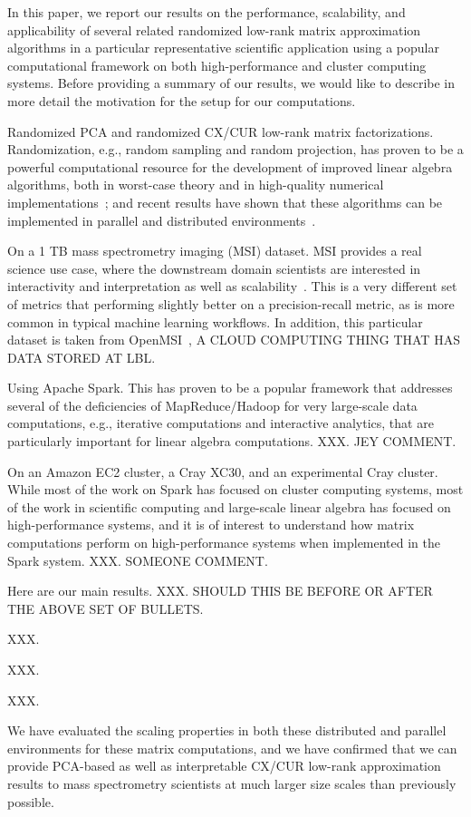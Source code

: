 In this paper, we report our results on the performance, scalability, and applicability of several related randomized low-rank matrix approximation algorithms in a particular representative scientific application using a popular computational framework on both high-performance and cluster computing systems.
Before providing a summary of our results, we would like to describe in more detail the motivation for the setup for our computations.
\begin{compactitem}
\item
Randomized PCA and randomized CX/CUR low-rank matrix factorizations. 
Randomization, e.g., random sampling and random projection, has proven to be a powerful computational resource for the development of improved linear algebra algorithms, both in worst-case theory and in high-quality numerical implementations~\cite{Mah-mat-rev_BOOK}; and recent results have shown that these algorithms can be implemented in parallel and distributed environments~\cite{YMM15_TR}.
\item
On a 1 TB mass spectrometry imaging (MSI) dataset.
MSI provides a real science use case, where the downstream domain scientists are interested in interactivity and interpretation as well as scalability~\cite{YRPMB15}.
This is a very different set of metrics that performing slightly better on a precision-recall metric, as is more common in typical machine learning workflows.
In addition, this particular dataset is taken from OpenMSI~\cite{OpenMIS13}, A CLOUD COMPUTING THING THAT HAS DATA STORED AT LBL.
\item
Using Apache Spark. 
This has proven to be a popular framework that addresses several of the deficiencies of MapReduce/Hadoop for very large-scale data computations, e.g., iterative computations and interactive analytics, that are particularly important for linear algebra computations.
XXX.  JEY COMMENT.
\item
On an Amazon EC2 cluster, a Cray XC30, and an experimental Cray cluster.  
While most of the work on Spark has focused on cluster computing systems, most of the work in scientific computing and large-scale linear algebra has focused on high-performance systems, and it is of interest to understand how matrix computations perform on high-performance systems when implemented in the Spark system.
XXX.  SOMEONE COMMENT.
\end{compactitem}

Here are our main results.
XXX.  SHOULD THIS BE BEFORE OR AFTER THE ABOVE SET OF BULLETS.
\begin{compactitem}
\item
XXX.
\item
XXX.
\item
XXX.
\item
We have evaluated the scaling properties in both these distributed and parallel environments for these matrix computations, and we have confirmed that we can provide PCA-based as well as interpretable CX/CUR low-rank approximation results to mass spectrometry scientists at much larger size scales than previously possible.  
\end{compactitem}

